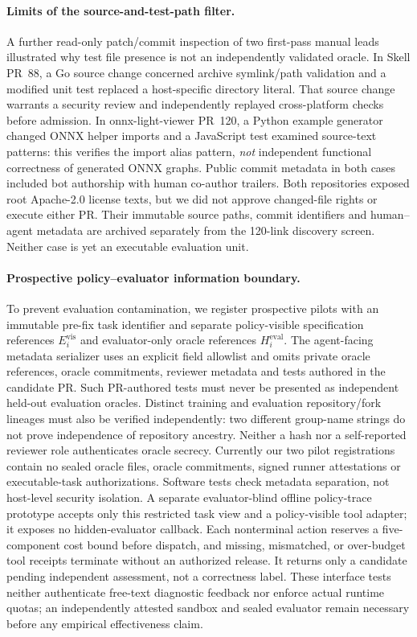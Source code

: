 \documentclass[pdflatex,sn-basic]{sn-jnl}
\begin{document}
\paragraph{Limits of the source-and-test-path filter.}
A further read-only patch/commit inspection of two
first-pass manual leads illustrated why test file
presence is not an independently validated oracle.
In Skell PR~88, a Go source change concerned
archive symlink/path validation and a modified
unit test replaced a host-specific directory
literal. That source change warrants a security
review and independently replayed cross-platform
checks before admission. In onnx-light-viewer
PR~120, a Python example generator changed ONNX
helper imports and a JavaScript test examined
source-text patterns: this verifies the import
alias pattern, \emph{not} independent functional
correctness of generated ONNX graphs. Public
commit metadata in both cases included bot
authorship with human co-author trailers.
Both repositories exposed root Apache-2.0
license texts, but we did not approve
changed-file rights or execute either PR.
Their immutable source paths, commit identifiers
and human--agent metadata are archived separately
from the 120-link discovery screen. Neither case
is yet an executable evaluation unit.

\paragraph{Prospective policy--evaluator information boundary.}
To prevent evaluation contamination, we register
prospective pilots with an immutable pre-fix task
identifier and separate policy-visible specification
references $E_i^{\mathrm{vis}}$ and evaluator-only
oracle references $H_i^{\mathrm{eval}}$.
The agent-facing metadata serializer uses an
explicit field allowlist and omits private
oracle references, oracle commitments, reviewer
metadata and tests authored in the candidate PR.
Such PR-authored tests must never be presented
as independent held-out evaluation oracles.
Distinct training and evaluation repository/fork
lineages must also be verified independently:
two different group-name strings do not prove
independence of repository ancestry. Neither
a hash nor a self-reported reviewer role
authenticates oracle secrecy. Currently our two
pilot registrations contain no sealed oracle
files, oracle commitments, signed runner
attestations or executable-task authorizations.
Software tests check metadata separation, not
host-level security isolation. A separate evaluator-blind offline
policy-trace prototype accepts only this restricted task view and a
policy-visible tool adapter; it exposes no hidden-evaluator callback.
Each nonterminal action reserves a five-component cost bound before
dispatch, and missing, mismatched, or over-budget tool receipts terminate
without an authorized release. It returns only a candidate pending
independent assessment, not a correctness label. These interface tests
neither authenticate free-text diagnostic feedback nor enforce actual
runtime quotas; an independently attested sandbox and sealed evaluator
remain necessary before any empirical effectiveness claim.
\end{document}
